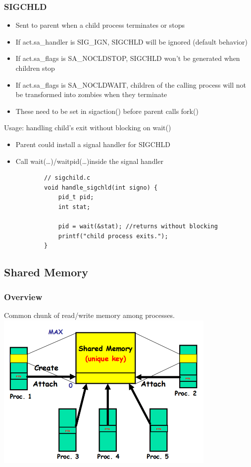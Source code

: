 \documentclass[12pt]{article}
\begin{document}
\subsubsection{SIGCHLD}
\begin{itemize}
    \item Sent to parent when a child process terminates or stops
    \item If act.sa\_handler is SIG\_IGN, SIGCHLD will be ignored (default behavior)
    \item If act.sa\_flags is SA\_NOCLDSTOP, SIGCHLD won't be generated when children stop
    \item If act.sa\_flags is SA\_NOCLDWAIT, children of the calling process will not be transformed into zombies when they terminate
    \item These need to be set in sigaction() before parent calls fork()
\end{itemize}
Usage: handling child's exit without blocking on wait()
\begin{itemize}
    \item Parent could install a signal handler for SIGCHLD
    \item Call wait(…)/waitpid(…)inside the signal handler \begin{lstlisting}
        // sigchild.c
        void handle_sigchld(int signo) {
            pid_t pid;
            int stat;
 
            pid = wait(&stat); //returns without blocking 
            printf("child process exits.");
        }
        \end{lstlisting}
\end{itemize}

\subsection{Shared Memory}
\subsubsection{Overview}
Common chunk of read/write memory among processes.
\newline
\includegraphics[width=0.8\textwidth]{SharedMemoryOverview.png}
\end{document}
